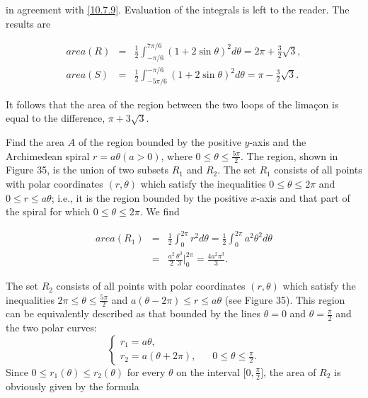 \begin{example}
\noindent in agreement with
\eqref{10.7.9}.
Evaluation of the integrals is left to the reader. The results are

\begin{eqnarray*}
area(R) &=& \frac{1}{2} \int_{-\pi/6}^{7\pi/6} (1 + 2 \sin \theta)^2 d\theta = 2\pi + \frac{3}{2} \sqrt 3, \\
area(S) &=& \frac{1}{2} \int_{-5\pi/6}^{-\pi/6} (1 + 2 \sin \theta)^2 d\theta = \pi - \frac{3}{2} \sqrt 3.
\end{eqnarray*}

\noindent It follows that the area of the region between the two loops of the lima\c{c}on is equal to the difference, $\pi + 3 \sqrt 3$.
\end{example}
\begin{example} Find the area $A$ of the region bounded by the positive $y$-axis and the Archimedean spiral $r = a\theta (a > 0)$, where $0 \leq \theta \leq \frac{5\pi}{2}$. The region, shown in Figure 35, is the union of two subsets $R_1$ and $R_2$. The set $R_1$ consists of all points with polar coordinates $(r, \theta)$ which satisfy the inequalities $0 \leq \theta \leq 2\pi$ and $0 \leq r \leq a\theta$; i.e., it is the region bounded by the positive $x$-axis and that part of the spiral for which $0 \leq \theta \leq 2\pi$. We find

\begin{eqnarray*}
area(R_1) &=& \frac{1}{2} \int_0^{2\pi} r^2 d\theta = \frac{1}{2} \int_0^{2\pi} a^2 \theta^2 d \theta \\
&=& \frac{a^2}{2} \frac{\theta^3}{3} \Big|_0^{2\pi} = \frac{4a^2 {\pi}^3}{3}.
\end{eqnarray*}

 
\noindent The set $R_2$ consists of all points with polar coordinates $(r, \theta)$ which satisfy the inequalities $2\pi \leq \theta \leq \frac{5\pi}{2}$ and $a(\theta - 2\pi) \leq r \leq a\theta$ (see Figure 35). This region can be equivalently described as that bounded by the lines $\theta = 0$ and $\theta = \frac{\pi}{2}$ and the two polar curves: 
$$
\left \{ \begin{array}{ll}
r_1 = a\theta,                    &\\
r_2 = a(\theta + 2\pi), \;\;\; & 0 \leq \theta \leq \frac{\pi}{2} .
\end{array}
\right .
$$
\noindent Since $0 \leq r_1(\theta) \leq r_2(\theta)$ for every $\theta$ on the interval $\Big[0, \frac{\pi}{2}\Big]$, the area of $R_2$ is obviously given by the formula 


\end{example}
